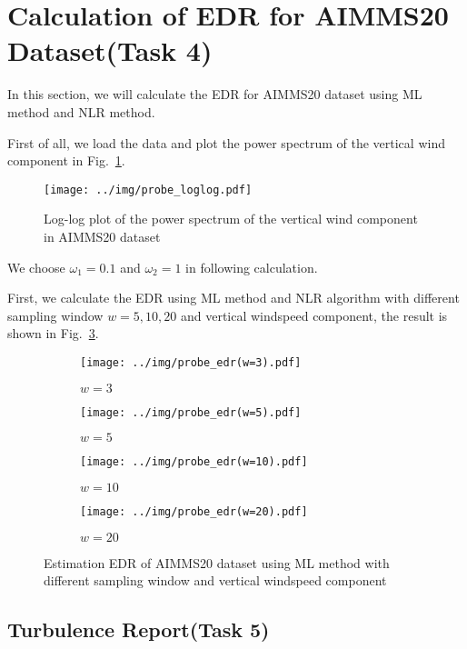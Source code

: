 \documentclass[runningheads]{llncs}
\begin{document}
\section{Calculation of EDR for AIMMS20 Dataset(Task 4)}

In this section, we will calculate the EDR for AIMMS20 dataset using ML method and NLR method.

First of all, we load the data and plot the power spectrum of the vertical wind component in Fig.~\ref{fig:4}.

\begin{figure}[!htbp]
    \centering
    \texttt{[image: ../img/probe\_loglog.pdf]}
    \caption{Log-log plot of the power spectrum of the vertical wind component in AIMMS20 dataset}
    \label{fig:4}
\end{figure}

We choose $\omega_1=0.1$ and $\omega_2=1$ in following calculation.

First, we calculate the EDR using ML method and NLR algorithm with different sampling window $w=5,10,20$ and 
vertical windspeed component, the result is shown in Fig.~\ref{fig:6}.

\begin{figure}[!htbp]
    \centering
    \begin{subfigure}{.4\textwidth}
        \centering
        \texttt{[image: ../img/probe\_edr(w=3).pdf]}
        \caption{$w=3$}
        \label{fig:6a}
    \end{subfigure}
    \begin{subfigure}{.4\textwidth}
        \centering
        \texttt{[image: ../img/probe\_edr(w=5).pdf]}
        \caption{$w=5$}
    \end{subfigure}
    \begin{subfigure}{.4\textwidth}
        \centering
        \texttt{[image: ../img/probe\_edr(w=10).pdf]}
        \caption{$w=10$}
    \end{subfigure}
    \begin{subfigure}{.4\textwidth}
        \centering
        \texttt{[image: ../img/probe\_edr(w=20).pdf]}
        \caption{$w=20$}
    \end{subfigure}
    \caption{Estimation EDR of AIMMS20 dataset using ML method with different sampling window and vertical windspeed component}
    \label{fig:6}
\end{figure}

\subsection{Turbulence Report(Task 5)}
\end{document}
